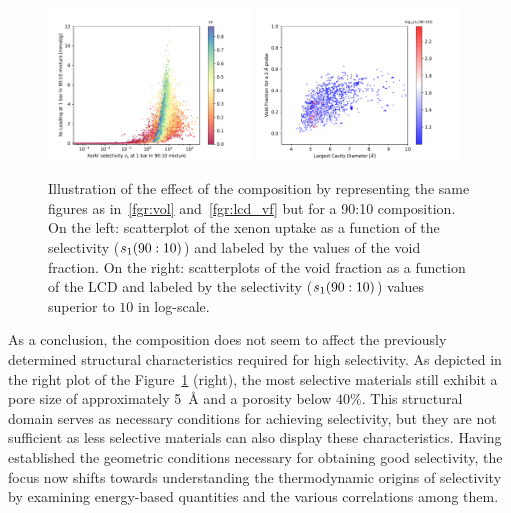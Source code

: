 \documentclass[main.tex]{subfiles}
\begin{document}
\begin{figure}[ht!]
  \centering
  \includegraphics[width=0.48\textwidth]{figures/2-thermo/Scatterplot_uptake_selectivity_vol_9010.pdf} 
  \hfill 
  \includegraphics[width=0.48\textwidth]{figures/2-thermo/Scatterplot_vf_lcd_selectivity9010.pdf}
  \caption{Illustration of the effect of the composition by representing the same figures as in~\ref{fgr:vol} and~\ref{fgr:lcd_vf} but for a 90:10 composition. On the left: scatterplot of the xenon uptake as a function of the selectivity ($s_{\text{1}}(90:10)$) and labeled by the values of the void fraction. On the right: scatterplots of the void fraction as a function of the LCD and labeled by the selectivity ($s_{\text{1}}(90:10)$) values superior to $10$ in log-scale.}\label{fgr:compo}
\end{figure}

As a conclusion, the composition does not seem to affect the previously determined structural characteristics required for high selectivity. As depicted in the right plot of the Figure~\ref{fgr:compo} (right), the most selective materials still exhibit a pore size of approximately \SI{5}{\angstrom} and a porosity below {$40$\%}. This structural domain serves as necessary conditions for achieving selectivity, but they are not sufficient as less selective materials can also display these characteristics. Having established the geometric conditions necessary for obtaining good selectivity, the focus now shifts towards understanding the thermodynamic origins of selectivity by examining energy-based quantities and the various correlations among them.
\end{document}
